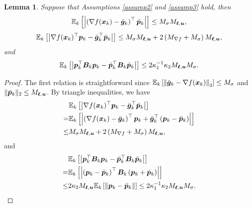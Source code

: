\documentclass[aos]{imsart}
\numberwithin{equation}{section}
\theoremstyle{plain}
\newtheorem{lemma}{Lemma}
\begin{document}
\begin{appendix}
\begin{lemma}
\label{lemma21}
    Suppose that Assumptions \ref{assump2} and \ref{assump3} hold, then
    \begin{equation}
        \mathbb{E}_k  \left[ \left|\left( \nabla f(\bm{x}_k) - \Bar{\bm{g}}_{k}\right)^{\top} \Bar{\bm{p}}_k \right|\right] \leq M_{\sigma} M_{\bm{\ell},\bm{u}},
    \end{equation}
    \begin{equation}
        \mathbb{E}_k \left[ \left|\nabla f(\bm{x}_k)^{\top} \bm{p}_k -  \Bar{\bm{g}}_k^{\top} \Bar{\bm{p}}_k \right| \right] \leq M_{\sigma} M_{\bm{\ell},\bm{u}} + 2 \left(M_{\nabla f} + M_{\sigma} \right)  M_{\bm{\ell},\bm{u}},
    \end{equation}
    and
    \begin{equation}
        \mathbb{E}_k\left[ \left|\bm{p}_k^{\top} \bm{B}_k \bm{p}_k -  \Bar{\bm{p}}_k^{\top} \bm{B}_k \Bar{\bm{p}}_k \right| \right] \leq 2\kappa_1^{-1} \kappa_2 M_{\bm{\ell},\bm{u}} M_{\sigma}.
    \end{equation}
\end{lemma}

\begin{proof}
   The first relation is straightforward since $\mathbb{E}_k \left[ \left\| \Bar{\bm{g}}_k - \nabla f(\bm{x}_k)\right\|_2 \right] \leq M_{\sigma}$ and $\|\Bar{\bm{p}}_k\|_2 \leq M_{\bm{\ell},\bm{u}}$. By triangle inequalities, we have
    \begin{equation*}
        \begin{split}
            & \mathbb{E}_k \left[ \left|\nabla f(\bm{x}_k)^{\top} \bm{p}_k -  \Bar{\bm{g}}_k^{\top} \Bar{\bm{p}}_k \right| \right] \\
            = &\mathbb{E}_k \left[ \left| \left( \nabla f(\bm{x}_k) - \Bar{\bm{g}}_k \right)^{\top}\bm{p}_k + \Bar{\bm{g}}_k^{\top} \left(\bm{p}_k - \Bar{\bm{p}}_k \right) \right|\right] \\
            \leq & M_{\sigma} M_{\bm{\ell},\bm{u}} + 2 \left(M_{\nabla f} + M_{\sigma} \right) M_{\bm{\ell},\bm{u}},
        \end{split}
    \end{equation*}
    and
    \begin{equation*}
        \begin{split}
            & \mathbb{E}_k\left[ \left| \bm{p}_k^{\top} \bm{B}_k \bm{p}_k -  \Bar{\bm{p}}_k^{\top} \bm{B}_k \Bar{\bm{p}}_k \right| \right] \\
            = & \mathbb{E}_k\left[ \left|\left(\bm{p}_k - \Bar{\bm{p}}_k\right)^{\top} \bm{B}_k \left(\bm{p}_k + \Bar{\bm{p}}_k \right) \right| \right]\\
            \leq & 2\kappa_2 M_{\bm{\ell},\bm{u}} \mathbb{E}_k\left[ \left\| \bm{p}_k - \Bar{\bm{p}}_k \right\| \right] \leq 2\kappa_1^{-1} \kappa_2 M_{\bm{\ell},\bm{u}} M_{\sigma}.
        \end{split}
    \end{equation*}
\end{proof}



\end{appendix}
\end{document}
